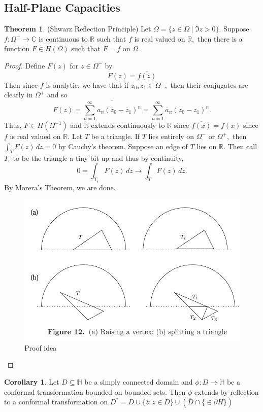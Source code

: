 \documentclass[10pt, oneside]{article}
\newcommand{\bbR}{\mathbb{R}}
\newcommand{\bbC}{\mathbb{C}}
\theoremstyle{definition}
\newtheorem{thm}{Theorem}
\newtheorem{cor}{Corollary}
\newcommand{\bbC}{\mathbb{C}}
\newcommand{\bbH}{\mathbb{H}}
\newcommand{\bbR}{\mathbb{R}}
\begin{document}
\newpage
\subsection{Half-Plane Capacities}
\begin{thm}
    (Shwarz Reflection Principle) Let $\Omega =\{z \in \Omega \mid \Im{z} >0\}$. Suppose $f: \Omega^+ \to \bbC$ is continuous to $\bbR$ such that $f$ is real valued on $\bbR,$ then there is a function $F \in H(\Omega)$ such that $F = f$ on $\Omega.$ 
\end{thm}
\begin{proof}
    Define $F(z)$ for $z\in \Omega^-$ by 
    \[F(z) = \overline{f(\overline{z})}\] Then since $f$ is analytic, we have that if $z_0, z_1 \in \Omega^{-},$ then their conjugates are clearly in $\Omega^+$ and so
    \[F(z) = \overline{\sum_{n=1}^\infty a_n (\overline{z}_0 - \overline{z}_1)^n} = \sum_{n=1}^\infty \overline{a}_n (z_0 - z_1)^n.\] Thus, $F\in H(\Omega^{-1})$ and it extends continuously to $\bbR$ since $\overline{f(x)} = f(x)$ since $f$ is real valued on $\bbR.$ Let $T$ be a triangle. If $T$ lies entirely on $\Omega^{-}$ or $\Omega^+,$ then $\int_T F(z)\,dz = 0$ by Cauchy's theorem. Suppose an edge of $T$ lies on $\bbR.$ Then call $T_\epsilon$ to be the triangle a tiny bit up and thus by continuity,
    \[0 = \int_{T_\epsilon} F(z)\,dz \to \int_{T} F(z)\,dz.\] By Morera's Theorem, we are done. 
    \begin{figure}[H]
        \centering
        \includegraphics[width=0.5\linewidth]{Images/Symmetry Principle.png}
        \caption{Proof idea}
    \end{figure}
\end{proof}
\begin{cor}
    Let $D\subseteq \bbH$ be a simply connected domain and $\phi: D\to \bbH$ be a conformal transformation bounded on bounded sets. Then $\phi $ extends by reflection to a conformal transformation on $D^* = D\cup \{\overline{z}:z \in D\}\cup(\overline{D} \cap \{ \in \partial H\})$
\end{cor}
\end{document}
